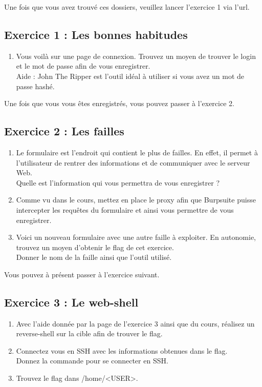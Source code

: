 Une fois que vous avez trouvé ces dossiers, veuillez lancer l’exercice 1 via l’url.

\subsection{Exercice 1 : Les bonnes habitudes}

\begin{enumerate}
    \item Vous voilà sur une page de connexion. Trouvez un moyen de trouver le login et le mot de passe afin de vous enregistrer.\\
    Aide : John The Ripper est l’outil idéal à utiliser si vous avez un mot de passe hashé.
\end{enumerate}

Une fois que vous vous êtes enregistrés, vous pouvez passer à l’exercice 2.

\subsection{Exercice 2 : Les failles}

\begin{enumerate}
    \item Le formulaire est l’endroit qui contient le plus de failles. En effet, il permet à l’utilisateur de rentrer des informations et de communiquer avec le serveur Web.\\
    Quelle est l’information qui vous permettra de vous enregistrer ?
    \item Comme vu dans le cours, mettez en place le proxy afin que Burpsuite puisse intercepter les requêtes du formulaire et ainsi vous permettre de vous enregistrer.
    \item Voici un nouveau formulaire avec une autre faille à exploiter. En autonomie, trouvez un moyen d’obtenir le flag de cet exercice.\\
    Donner le nom de la faille ainsi que l’outil utilisé.
\end{enumerate}

Vous pouvez à présent passer à l'exercice suivant.

\subsection{Exercice 3 : Le web-shell}

\begin{enumerate}
    \item Avec l’aide donnée par la page de l’exercice 3 ainsi que du cours, réalisez un reverse-shell sur la cible afin de trouver le flag.
    \item Connectez vous en SSH avec les informations obtenues dans le flag.\\
    Donnez la commande pour se connecter en SSH.
    \item Trouvez le flag dans /home/<USER>.
\end{enumerate}

